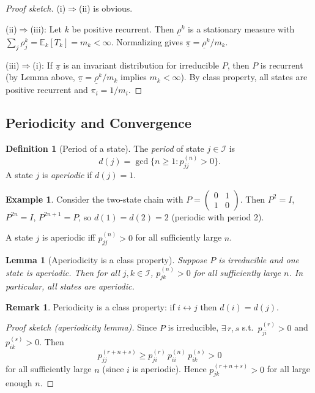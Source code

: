 \documentclass[12pt, a4paper]{article}
\theoremstyle{definition}
\newtheorem{definition}{Definition}[section]
\newtheorem{example}{Example}[section]
\newtheorem{remark}{Remark}[section]
\theoremstyle{plain}
\newtheorem{lemma}{Lemma}[section]
\newcommand{\EE}{\mathbb{E}}
\newcommand{\II}{\mathcal{I}}
\begin{document}
\begin{proof}[Proof sketch]
(i)$\Rightarrow$(ii) is obvious. 

(ii)$\Rightarrow$(iii): Let $k$ be positive recurrent. Then $\underline{\rho}^k$ is a stationary measure with $\sum_j \rho_j^k = \EE_k[T_k] = m_k < \infty$. Normalizing gives $\underline{\pi} = \underline{\rho}^k / m_k$.

(iii)$\Rightarrow$(i): If $\underline{\pi}$ is an invariant distribution for irreducible $P$, then $P$ is recurrent (by Lemma above, $\underline{\pi} = \underline{\rho}^k/m_k$ implies $m_k < \infty$). By class property, all states are positive recurrent and $\pi_i = 1/m_i$.
\end{proof}


\subsection{Periodicity and Convergence}

\begin{definition}[Period of a state]
The \emph{period} of state $j \in \II$ is
\begin{equation*}
  d(j) = \gcd\{n \ge 1 : p_{jj}^{(n)} > 0\}.
\end{equation*}
A state $j$ is \emph{aperiodic} if $d(j) = 1$.
\end{definition}

\begin{example}
Consider the two-state chain with $P = \begin{pmatrix}0&1\\1&0\end{pmatrix}$. Then $P^2 = I$, $P^{2n} = I$, $P^{2n+1} = P$, so $d(1) = d(2) = 2$ (periodic with period 2).

A state $j$ is aperiodic iff $p_{jj}^{(n)} > 0$ for all sufficiently large $n$.
\end{example}

\begin{lemma}[Aperiodicity is a class property]
Suppose $P$ is irreducible and one state is aperiodic. Then for all $j, k \in \II$, $p_{jk}^{(n)} > 0$ for all sufficiently large $n$. In particular, all states are aperiodic.
\end{lemma}

\begin{remark}
Periodicity is a class property: if $i \leftrightarrow j$ then $d(i) = d(j)$.
\end{remark}

\begin{proof}[Proof sketch (aperiodicity lemma)]
Since $P$ is irreducible, $\exists\, r, s$ s.t.\ $p_{ji}^{(r)} > 0$ and $p_{ik}^{(s)} > 0$. Then
\begin{equation*}
  p_{jj}^{(r+n+s)} \ge p_{ji}^{(r)}\, p_{ii}^{(n)}\, p_{ik}^{(s)} > 0
\end{equation*}
for all sufficiently large $n$ (since $i$ is aperiodic). Hence $p_{jk}^{(r+n+s)} > 0$ for all large enough $n$.
\end{proof}
\end{document}
